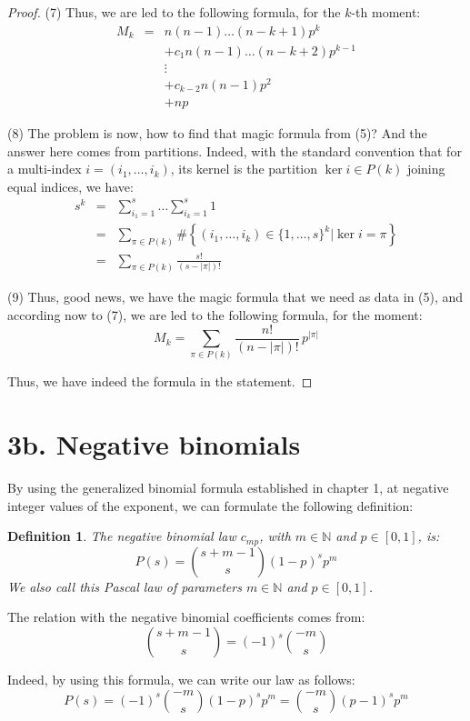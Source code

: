 \documentclass[12pt]{amsbook}
\newtheorem{definition}[theorem]{Definition}
\begin{document}
\begin{proof}
(7) Thus, we are led to the following formula, for the $k$-th moment:
\begin{eqnarray*}
M_k
&=&n(n-1)\ldots(n-k+1)p^k\\
&&+c_1n(n-1)\ldots (n-k+2)p^{k-1}\\
&&\vdots\\
&&+c_{k-2}n(n-1)p^2\\
&&+np
\end{eqnarray*}

(8) The problem is now, how to find that magic formula from (5)? And the answer here comes from partitions. Indeed, with the standard convention that for a multi-index $i=(i_1,\ldots,i_k)$, its kernel is the partition $\ker i\in P(k)$ joining equal indices, we have:
\begin{eqnarray*}
s^k
&=&\sum_{i_1=1}^s\ldots\sum_{i_k=1}^s1\\
&=&\sum_{\pi\in P(k)}\#\left\{(i_1,\ldots,i_k)\in\{1,\ldots,s\}^k\Big|\ker i=\pi\right\}\\
&=&\sum_{\pi\in P(k)}\frac{s!}{(s-|\pi|)!}
\end{eqnarray*}

(9) Thus, good news, we have the magic formula that we need as data in (5), and according now to (7), we are led to the following formula, for the moment:
$$M_k=\sum_{\pi\in P(k)}\frac{n!}{(n-|\pi|)!}\,p^{|\pi|}$$

Thus, we have indeed the formula in the statement.
\end{proof}

\section*{3b. Negative binomials}

By using the generalized binomial formula established in chapter 1, at negative integer values of the exponent, we can formulate the following definition:


\begin{definition}
The negative binomial law $c_{mp}$, with $m\in\mathbb N$ and $p\in[0,1]$, is:
$$P(s)=\binom{s+m-1}{s}(1-p)^sp^m$$
We also call this Pascal law of parameters $m\in\mathbb N$ and $p\in[0,1]$.
\end{definition}

The relation with the negative binomial coefficients comes from:
$$\binom{s+m-1}{s}=(-1)^s\binom{-m}{s}$$

Indeed, by using this formula, we can write our law as follows:
$$P(s)=(-1)^s\binom{-m}{s}(1-p)^sp^m=\binom{-m}{s}(p-1)^sp^m$$
\end{document}
